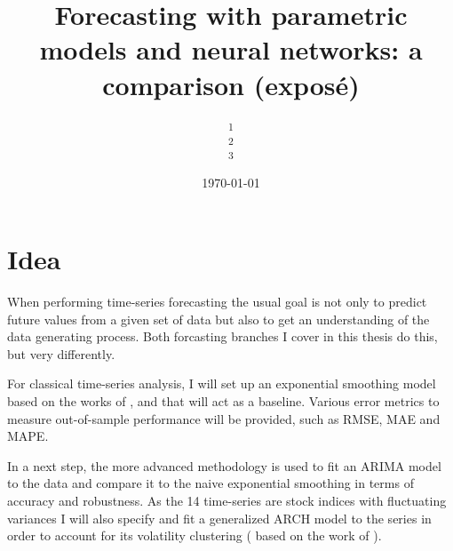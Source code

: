 \documentclass[11pt, a4paper, twocolumn]{article}
\title{Forecasting with parametric models and neural networks: a comparison (exposé)} %
\author{
	\authorstyle{Niklas Paulig\textsuperscript{1,2,3}} %
	\newline\newline %
	\textsuperscript{1}\institution{Technical University of Dresden, Dresden, Germany}\\
	\textsuperscript{2}\institution{Mat.Nr: 4064033}\\
	\textsuperscript{3}\institution{Master VWL, Fak. Wirtschaftswissenschaften}
}
\date{\today} %
\begin{document}
\maketitle %

\thispagestyle{firstpage} %




\section{Idea}

When performing time-series forecasting the usual goal is not only to predict future values from a given set of data but also to get an understanding of the data generating process. Both forcasting branches I cover in this thesis do this, but very differently.

For classical time-series analysis, I will set up an exponential smoothing model based on the works of \citet{brown1962smoothing}, \citet{holt1957forecasting} and \citet{winters1960forecasting} that will act as a baseline. Various error metrics to measure out-of-sample performance will be provided, such as RMSE, MAE and MAPE. 

In a next step, the more advanced \citet{box1976time} methodology is used to fit an ARIMA model to the data and compare it to the naive exponential smoothing in terms of accuracy and robustness. As the 14 time-series are stock indices with fluctuating variances I will also specify and fit a generalized ARCH  model to the series in order to account for its volatility clustering (\citet{bollerslev1994arch} based on the work of \citet{engle1982autoregressive}).
\end{document}
